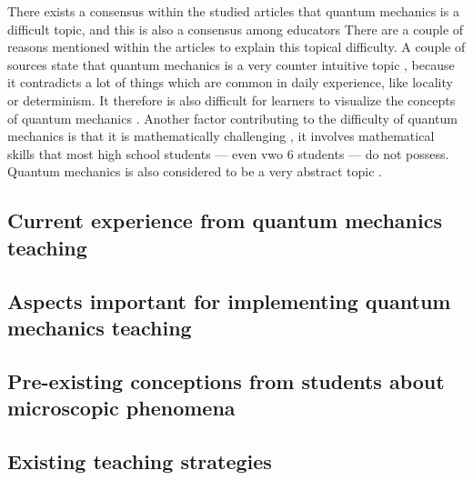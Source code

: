 \documentclass[11pt,twoside]{report} %
\begin{document}
There exists a consensus within the studied articles that quantum mechanics is a difficult topic, and this is also a consensus among educators \cite{papaphotis1,papaphotis2,gianino} There are a couple of reasons mentioned within the articles to explain this topical difficulty. A couple of sources state that quantum mechanics is a very counter intuitive topic \cite{mckagan, singh2, levrini, henriksen}, because it contradicts a lot of things which are common in daily experience, like locality or determinism. It therefore is also difficult for learners to visualize the concepts of quantum mechanics \cite{mckagan, henriksen}. Another factor contributing to the difficulty of quantum mechanics is that it is mathematically challenging \cite{mckagan,gianino}, it involves mathematical skills that most high school students --- even vwo 6 students --- do not possess. Quantum mechanics is also considered to be a very abstract topic \cite{mckagan, papaphotis1, singh1, gianino, barnes}.

\subsection{Current experience from quantum mechanics teaching}

\subsection{Aspects important for implementing quantum mechanics teaching}

\subsection{Pre-existing conceptions from students about microscopic phenomena}

\subsection{Existing teaching strategies}



\end{document}
